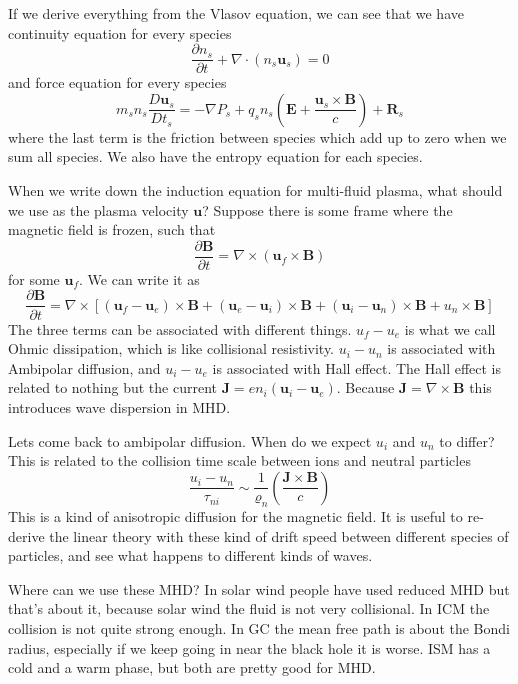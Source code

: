 \documentclass[letterpaper, 11pt]{article}
\numberwithin{equation}{section}
\numberwithin{figure}{section}
\begin{document}
If we derive everything from the Vlasov equation, we can see that we have
continuity equation for every species
\begin{equation}
  \label{eq:17}
  \frac{\partial n_s}{\partial t} + \nabla\cdot \left( n_s\mathbf{u}_s \right) = 0
\end{equation}
and force equation for every species
\begin{equation}
  \label{eq:18}
  m_sn_s\frac{D \mathbf{u}_s}{D t_s} = -\nabla P_s + q_sn_s \left( \mathbf{E} + \frac{\mathbf{u}_s\times \mathbf{B}}{c} \right) + \mathbf{R}_s
\end{equation}
where the last term is the friction between species which add up to zero when we
sum all species. We also have the entropy equation for each species.

When we write down the induction equation for multi-fluid plasma, what should we
use as the plasma velocity $\mathbf{u}$? Suppose there is some frame where the
magnetic field is frozen, such that
\begin{equation}
  \label{eq:19}
  \frac{\partial \mathbf{B}}{\partial t} = \nabla \times \left( \mathbf{u}_f\times \mathbf{B} \right)
\end{equation}
for some $\mathbf{u}_{f}$. We can write it as
\begin{equation}
  \label{eq:20}
  \frac{\partial \mathbf{B}}{\partial t} = \nabla \times \left[ (\mathbf{u}_f - \mathbf{u}_{e}) \times \mathbf{B} + (\mathbf{u}_{e} - \mathbf{u}_{i})\times \mathbf{B} + (\mathbf{u}_{i} - \mathbf{u}_{n})\times \mathbf{B} + u_n\times \mathbf{B} \right]
\end{equation}
The three terms can be associated with different things. $u_f - u_{e}$ is what
we call Ohmic dissipation, which is like collisional resistivity. $u_i - u_n$ is
associated with Ambipolar diffusion, and $u_{i} - u_{e}$ is associated with Hall
effect. The Hall effect is related to nothing but the current $\mathbf{J} =
en_i(\mathbf{u}_{i} - \mathbf{u}_{e})$. Because $\mathbf{J} = \nabla\times
\mathbf{B}$ this introduces wave dispersion in MHD.

Lets come back to ambipolar diffusion. When do we expect $u_i$ and $u_n$ to
differ? This is related to the collision time scale between ions and neutral
particles
\begin{equation}
  \label{eq:21}
  \frac{u_i - u_n}{\tau_{ni}} \sim \frac{1}{\varrho_n}\left( \frac{\mathbf{J}\times \mathbf{B}}{c} \right)
\end{equation}
This is a kind of anisotropic diffusion for the magnetic field. It is useful to
re-derive the linear theory with these kind of drift speed between different
species of particles, and see what happens to different kinds of waves.

Where can we use these MHD? In solar wind people have used reduced MHD but
that's about it, because solar wind the fluid is not very collisional. In ICM
the collision is not quite strong enough. In GC the mean free path is about the
Bondi radius, especially if we keep going in near the black hole it is worse.
ISM has a cold and a warm phase, but both are pretty good for MHD.
\end{document}
